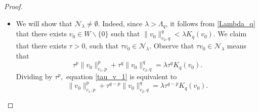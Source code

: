\documentclass[pdflatex,sn-mathphys-num]{sn-jnl}
\theoremstyle{thmstyleone}%
\theoremstyle{thmstyletwo}%
\theoremstyle{thmstylethree}%
\theoremstyle{thmstylethree}%
\begin{document}
\begin{proof}

\begin{itemize}
    \item[(i)] We will show that $\mathcal{N}_{\lambda}\ne \emptyset$. Indeed,
since $\lambda>\Lambda_{q}$, it follows from  \eqref{Lambda_q}  that there exists $v_{0} \in W \backslash\{0\}$ such that $\|v_0\|_{c_2,q}^q<\lambda K_q(v_{0})$. 
We claim that there exists $\tau>0$, such that $\tau v_{0} \in \mathcal{N}_{\lambda}$.  Observe that  $\tau v_{0} \in \mathcal{N}_{\lambda}$ means  that 
\begin{equation}\label{tau_v_1}
    \tau^{p} \|v_0\|_{c_1,p}^p+\tau^{q} \|v_0 \|_{c_2,q}^q=\lambda \tau^{q}K_q(v_{0}).
\end{equation}
Dividing  by $\tau^{p},$ equation \eqref{tau_v_1} is equivalent to 
\begin{equation}\label{tau_v_2}
    \|v_0 \|_{c_1,p}^p+\tau^{q-p} \|v_0 \|_{c_2,q}^q=\lambda \tau^{q-p}K_q(v_{0}).\end{equation}


\end{itemize}
\end{proof}
\end{document}
